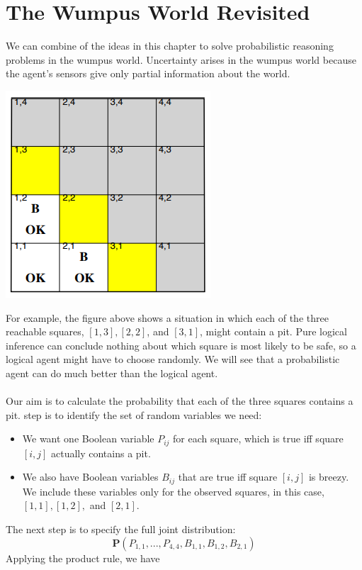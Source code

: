 \section{The Wumpus World Revisited}
We can combine of the ideas in this chapter to solve probabilistic reasoning problems in the wumpus world.  Uncertainty arises in the wumpus world because the agent’s sensors give only partial information about the world.
\begin{center}
    \includegraphics[]{images/Wumpus-probs.png}
\end{center}
For example, the figure above shows a situation in which each of the three reachable squares, $[1,3], [2,2]$, and $[3,1]$, might contain a pit. Pure logical inference can conclude nothing about which square is most likely to be safe, so a logical agent might have to choose randomly. We will see that a probabilistic agent can do much better than the logical agent.\\\\
Our aim is to calculate the probability that each of the three squares contains a pit.  step is to identify the set of random
variables we need:
\begin{itemize}
    \item We want one Boolean variable $P_{ij}$ for each square, which is true iff square $[i, j]$ actually contains a pit.

    \item We also have Boolean variables $B_{ij}$ that are true iff square $[i, j]$ is breezy. We include these variables only for the observed squares, in this case, $[1,1], [1,2],$ and $[2,1]$.
\end{itemize}
The next step is to specify the full joint distribution:
\[\textbf{P}(P_{1,1},...,P_{4,4}, B_{1,1}, B_{1,2}, B_{2,1})\]
Applying the product rule, we have
